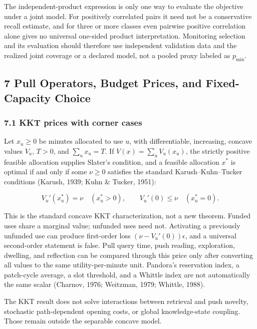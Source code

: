 \documentclass[
  11pt]{article}
\begin{document}
The independent-product expression is only one way to evaluate the
objective under a joint model. For positively correlated pairs it need
not be a conservative recall estimate, and for three or more classes
even pairwise positive correlation alone gives no universal one-sided
product interpretation. Monitoring selection and its evaluation should
therefore use independent validation data and the realized joint
coverage or a declared model, not a pooled proxy labeled as
\(p_{\min}\).

\subsection{7 Pull Operators, Budget Prices, and Fixed-Capacity
Choice}\label{pull-operators-budget-prices-and-fixed-capacity-choice}

\subsubsection{7.1 KKT prices with corner
cases}\label{kkt-prices-with-corner-cases}

Let \(x_u\ge0\) be minutes allocated to use \(u\), with differentiable,
increasing, concave values \(V_u\), \(T>0\), and \(\sum_ux_u=T\). If
\(V(x)=\sum_uV_u(x_u)\), the strictly positive feasible allocation
supplies Slater's condition, and a feasible allocation \(x^*\) is
optimal if and only if some \(\nu\ge0\) satisfies the standard
Karush--Kuhn--Tucker conditions (Karush, 1939; Kuhn \& Tucker, 1951):

\[V_u'(x_u^*)=\nu\quad(x_u^*>0),\qquad V_u'(0)\le\nu\quad(x_u^*=0).\tag{10}\]

This is the standard concave KKT characterization, not a new theorem.
Funded uses share a marginal value; unfunded uses need not. Activating a
previously unfunded use can produce first-order loss
\((\nu-V_u'(0))\epsilon\), and a universal second-order statement is
false. Pull query time, push reading, exploration, dwelling, and
reflection can be compared through this price only after converting all
values to the same utility-per-minute unit. Pandora's reservation index,
a patch-cycle average, a slot threshold, and a Whittle index are not
automatically the same scalar (Charnov, 1976; Weitzman, 1979; Whittle,
1988).

The KKT result does not solve interactions between retrieval and push
novelty, stochastic path-dependent opening costs, or global
knowledge-state coupling. Those remain outside the separable concave
model.
\end{document}
